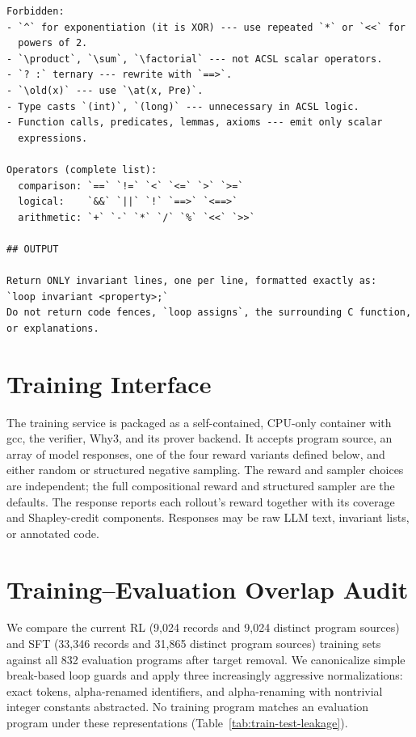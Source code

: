 \begin{promptbox}
\begin{lstlisting}[style=promptstyle]
Forbidden:
- `^` for exponentiation (it is XOR) --- use repeated `*` or `<<` for
  powers of 2.
- `\product`, `\sum`, `\factorial` --- not ACSL scalar operators.
- `? :` ternary --- rewrite with `==>`.
- `\old(x)` --- use `\at(x, Pre)`.
- Type casts `(int)`, `(long)` --- unnecessary in ACSL logic.
- Function calls, predicates, lemmas, axioms --- emit only scalar
  expressions.

Operators (complete list):
  comparison: `==` `!=` `<` `<=` `>` `>=`
  logical:    `&&` `||` `!` `==>` `<==>`
  arithmetic: `+` `-` `*` `/` `%` `<<` `>>`

## OUTPUT

Return ONLY invariant lines, one per line, formatted exactly as:
`loop invariant <property>;`
Do not return code fences, `loop assigns`, the surrounding C function,
or explanations.
\end{lstlisting}
\end{promptbox}

\section{Training Interface}
\label{app:service}

The training service is packaged as a self-contained, CPU-only container with
gcc, the verifier, Why3, and its prover backend.  It accepts program source,
an array of model responses, one of the four reward variants defined below,
and either random or structured negative sampling.  The reward and sampler
choices are independent; the full compositional reward and structured sampler
are the defaults.  The response reports each rollout's
reward together with its coverage and Shapley-credit components.  Responses may be raw LLM text, invariant lists, or annotated
code.

\section{Training--Evaluation Overlap Audit}
\label{app:data-leakage}

We compare the current RL (9,024 records and 9,024 distinct program sources)
and SFT (33,346 records and 31,865 distinct program sources) training sets
against all 832 evaluation programs after target removal.  We canonicalize
simple break-based loop guards and apply three increasingly aggressive
normalizations: exact tokens, alpha-renamed identifiers, and alpha-renaming
with nontrivial integer constants abstracted.  No training program matches
an evaluation program under these representations
(Table~\ref{tab:train-test-leakage}).

